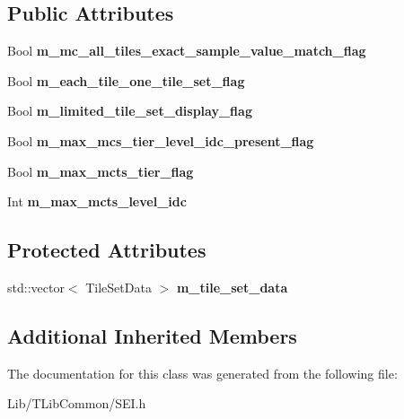 \subsection*{Public Attributes}
\begin{DoxyCompactItemize}
\item 
\mbox{\label{class_s_e_i_temp_motion_constrained_tile_sets_ae32da9b6d53c51508f3d7af3e62f7142}} 
Bool {\bfseries m\+\_\+mc\+\_\+all\+\_\+tiles\+\_\+exact\+\_\+sample\+\_\+value\+\_\+match\+\_\+flag}
\item 
\mbox{\label{class_s_e_i_temp_motion_constrained_tile_sets_a4aa5683589d1f074d0b436531032314a}} 
Bool {\bfseries m\+\_\+each\+\_\+tile\+\_\+one\+\_\+tile\+\_\+set\+\_\+flag}
\item 
\mbox{\label{class_s_e_i_temp_motion_constrained_tile_sets_a3c76c8f71c7bd5c9b8db4452a53ca31b}} 
Bool {\bfseries m\+\_\+limited\+\_\+tile\+\_\+set\+\_\+display\+\_\+flag}
\item 
\mbox{\label{class_s_e_i_temp_motion_constrained_tile_sets_a4a0b818b0c3e65a8169536344190675e}} 
Bool {\bfseries m\+\_\+max\+\_\+mcs\+\_\+tier\+\_\+level\+\_\+idc\+\_\+present\+\_\+flag}
\item 
\mbox{\label{class_s_e_i_temp_motion_constrained_tile_sets_afde61d2525cb755fa3bd3d26fd9fbafb}} 
Bool {\bfseries m\+\_\+max\+\_\+mcts\+\_\+tier\+\_\+flag}
\item 
\mbox{\label{class_s_e_i_temp_motion_constrained_tile_sets_a8205ff68a9d5c8a18819c9d8feadd99b}} 
Int {\bfseries m\+\_\+max\+\_\+mcts\+\_\+level\+\_\+idc}
\end{DoxyCompactItemize}
\subsection*{Protected Attributes}
\begin{DoxyCompactItemize}
\item 
\mbox{\label{class_s_e_i_temp_motion_constrained_tile_sets_a4f36d4cc06868179b69f62510529e466}} 
std\+::vector$<$ Tile\+Set\+Data $>$ {\bfseries m\+\_\+tile\+\_\+set\+\_\+data}
\end{DoxyCompactItemize}
\subsection*{Additional Inherited Members}


The documentation for this class was generated from the following file\+:\begin{DoxyCompactItemize}
\item 
Lib/\+T\+Lib\+Common/S\+E\+I.\+h\end{DoxyCompactItemize}
